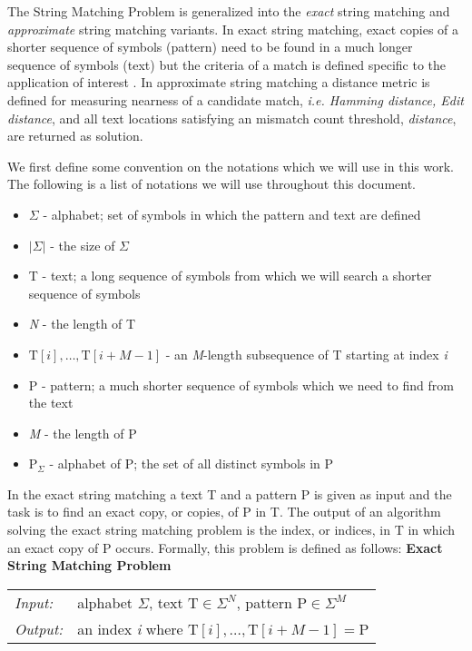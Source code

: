 The String Matching Problem is generalized into the \textit{exact} string matching and \textit{approximate} string matching variants. In exact string matching, exact copies of a shorter sequence of symbols (pattern) need to be found in a much longer sequence of symbols (text) but the criteria of a match is defined specific to the application of interest \cite{Baker1993,Amir1995}. In approximate string matching a distance metric is defined for measuring nearness of a candidate match, \textit{i.e. Hamming distance, Edit distance}, and all text locations satisfying an mismatch count threshold, \textit{distance}, are returned as solution.

We first define some convention on the notations which we will use in this work. The following is a list of notations we will use throughout this document. 
\begin{itemize}
	\item $\Sigma$ - alphabet; set of symbols in which the pattern and text are defined
	\item $\vert \Sigma \vert$ - the size of $\Sigma$
	\item T - text; a long sequence of symbols from which we will search a shorter sequence of symbols
	\item \textit{N} - the length of T
	\item $\mathrm{T}[i],\ldots,\mathrm{T}[i+M-1]$ - an \textit{M}-length subsequence of T starting at index \textit{i}
	\item P - pattern; a much shorter sequence of symbols which we need to find from the text
	\item \textit{M} - the length of P
	\item $\mathrm{P}_{\Sigma}$ - alphabet of P; the set of all distinct symbols in P
\end{itemize}

In the exact string matching a text T and a pattern P is given as input and the task is to find an exact copy, or copies, of P in T. The output of an algorithm solving the exact string matching problem is the index, or indices, in T in which an exact copy of P occurs. Formally, this problem is defined as follows:\newline
\newline
	\textbf{Exact String Matching Problem} \\
	\begin{tabular}{ l  p{10cm}}
		\textit{Input:} & alphabet $\Sigma$, text $\mathrm{T} \in \Sigma^N$, pattern $\mathrm{P} \in \Sigma^M$\\
		\textit{Output:} & an index \textit{i} where $\mathrm{T}[i],\ldots,\mathrm{T}[i+M-1]=\mathrm{P}$
	\end{tabular}\newline
	
